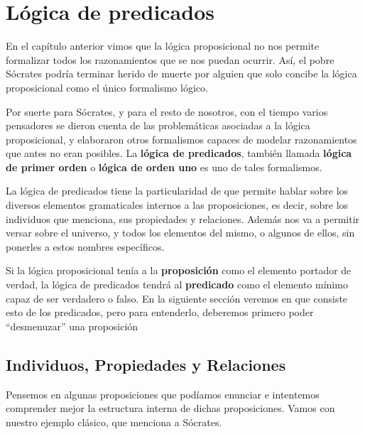 
\chapter{Lógica de predicados}
\label{chap:logica_predicados}

En el capítulo anterior vimos que la lógica proposicional no nos permite formalizar todos los razonamientos que se nos puedan ocurrir. Así, el pobre Sócrates podría terminar herido de muerte por alguien que solo concibe la lógica proposicional como el único formalismo lógico.

Por suerte para Sócrates, y para el resto de nosotros, con el tiempo varios pensadores se dieron cuenta de las problemáticas asociadas a la lógica proposicional, y elaboraron otros formalismos capaces de modelar razonamientos que antes no eran posibles. La \textbf{lógica de predicados}, también llamada
\textbf{lógica de primer orden} o \textbf{lógica de orden uno} es uno de tales
formalismos.

La lógica de predicados tiene la particularidad de que permite hablar sobre los
diversos elementos gramaticales internos a las proposiciones, es decir, sobre los
individuos que menciona, sus propiedades y relaciones. Además nos va a permitir versar sobre el universo, y todos los elementos del mismo, o algunos de ellos, sin ponerles a estos nombres específicos.

Si la lógica proposicional tenía a la \textbf{proposición} como el elemento portador de verdad, la lógica de predicados tendrá al \textbf{predicado} como el elemento mínimo capaz de ser verdadero o falso. En la siguiente sección veremos en que consiste esto de los predicados, pero para entenderlo, deberemos primero poder ``desmenuzar'' una proposición

\section{Individuos, Propiedades y Relaciones}
\label{chap:logica_predicados:sec:individuos_propiedades_relaciones}

Pensemos en algunas proposiciones que podíamos enunciar e intentemos comprender mejor la estructura interna de dichas proposiciones. Vamos con nuestro ejemplo clásico, que menciona a Sócrates.

